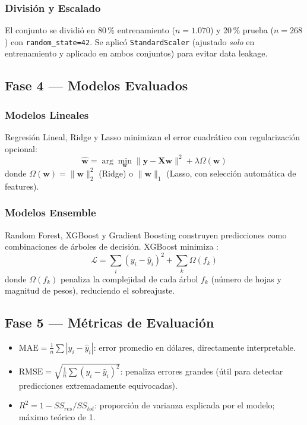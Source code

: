 \documentclass[12pt, a4paper]{article}
\begin{document}
\subsubsection{División y Escalado}

El conjunto se dividió en 80\,\% entrenamiento ($n = 1.070$) y 20\,\%
prueba ($n = 268$) con \texttt{random\_state=42}. Se aplicó
\texttt{StandardScaler} (ajustado \textit{solo} en entrenamiento y
aplicado en ambos conjuntos) para evitar data leakage.

\subsection{Fase 4 — Modelos Evaluados}

\subsubsection{Modelos Lineales}

Regresión Lineal, Ridge y Lasso minimizan el error cuadrático con
regularización opcional:
\begin{equation}
\hat{\mathbf{w}} = \arg\min_{\mathbf{w}}
\|\mathbf{y} - \mathbf{X}\mathbf{w}\|^2 + \lambda\Omega(\mathbf{w})
\end{equation}
donde $\Omega(\mathbf{w}) = \|\mathbf{w}\|_2^2$ (Ridge) o
$\|\mathbf{w}\|_1$ (Lasso, con selección automática de features).

\subsubsection{Modelos Ensemble}

Random Forest, XGBoost y Gradient Boosting construyen predicciones
como combinaciones de árboles de decisión. XGBoost minimiza
\cite{chen2016xgboost}:
\begin{equation}
\mathcal{L} = \sum_i\!\left(y_i - \hat{y}_i\right)^2 + \sum_k \Omega(f_k)
\end{equation}
donde $\Omega(f_k)$ penaliza la complejidad de cada árbol $f_k$
(número de hojas y magnitud de pesos), reduciendo el sobreajuste.

\subsection{Fase 5 — Métricas de Evaluación}

\begin{itemize}
  \item $\text{MAE} = \frac{1}{n}\sum|y_i - \hat{y}_i|$: error promedio
        en dólares, directamente interpretable.
  \item $\text{RMSE} = \sqrt{\frac{1}{n}\sum(y_i - \hat{y}_i)^2}$: penaliza
        errores grandes (útil para detectar predicciones extremadamente
        equivocadas).
  \item $R^2 = 1 - SS_{res}/SS_{tot}$: proporción de varianza explicada
        por el modelo; máximo teórico de 1.
\end{itemize}
\end{document}
